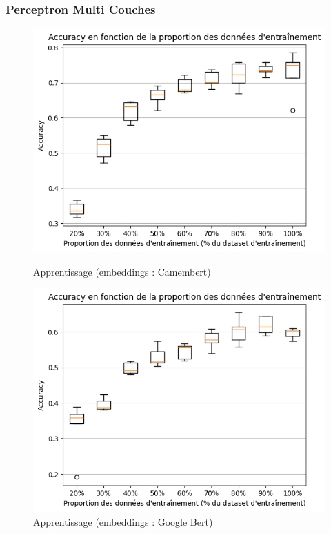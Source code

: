 \documentclass[12pt]{article}
\begin{document}
\subsubsection{Perceptron Multi Couches}

\begin{figure}[H]
    \centering
    \begin{minipage}[b]{0.45\textwidth}
        \centering
        \includegraphics[width=\textwidth]{static/stat_MLP_cam.png} 
        \caption{Apprentissage (embeddings : Camembert)}
        \label{fig:camenbert}
    \end{minipage}
    \hfill
    \begin{minipage}[b]{0.45\textwidth}
        \centering
        \includegraphics[width=\textwidth]{static/stat_MLP_goo.png} 
        \caption{Apprentissage (embeddings : Google Bert)}
        \label{fig:google_bert}
    \end{minipage}
\end{figure}
\end{document}
